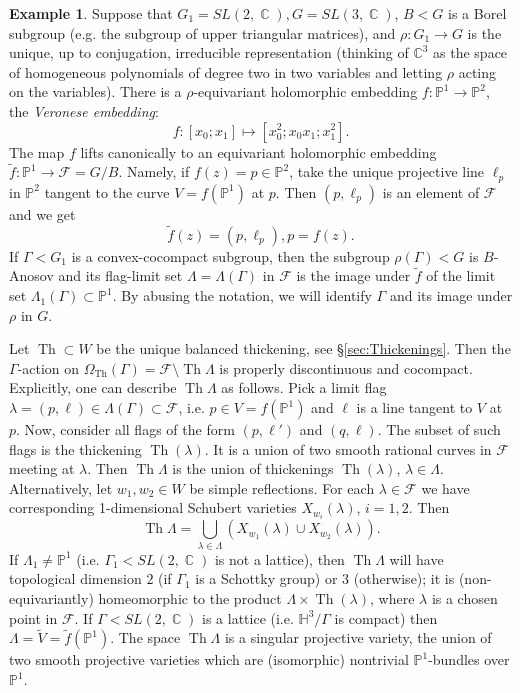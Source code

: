 \documentclass[12pt]{amsbook}%
\theoremstyle{definition}
\newtheorem{example}[thm]{Example}
\theoremstyle{remark}
\numberwithin{section}{chapter}
\numberwithin{subsection}{section}
\numberwithin{figure}{chapter}
\DeclareMathOperator{\C}{\mathbb{C}}
\DeclareMathOperator{\Th}{Th}
\def\bC{{\mathbb{C}}}
\def\P{{\mathbb{P}}}
\def\bH{{\mathbb{H}}}
\def\cF{{\mathscr{F}}}
\def\Ga{\Gamma}
\def\La{\Lambda}
\def\la{\lambda}
\def\kap{}
\begin{document}
{{\begin{example}\label{ex:Anosov1} 
Suppose that $G_1=SL(2,\C), G=SL(3,\C)$, $B<G$ is a Borel subgroup (e.g. the subgroup of upper triangular matrices), 
and $\rho: G_1\to G$ is the unique, up to conjugation, irreducible representation (thinking of $\bC^3$ as the space of homogeneous polynomials of degree two in two variables and letting $\rho$ acting on the variables). There is a $\rho$-equivariant holomorphic embedding $f: \P^1\to \P^2$, the {\em Veronese embedding}:
\[f:[x_0;x_1]\mapsto [x_0^2;x_0x_1;x_1^2].\]
The map $f$ lifts canonically to an equivariant holomorphic embedding 
$\tilde f: \P^1\to \cF= G/B$. Namely, if $f(z)= p\in \P^2$, take the unique projective line $\ell_p$ in $\P^2$ tangent to the curve $V=f(\P^1)$ at $p$. 
Then $(p, \ell_p)$ is an element of $\cF$ and we get 
$$
\tilde f(z)= (p, \ell_p), p=f(z). 
$$
If $\Ga< G_1$ is a convex-cocompact subgroup, then the subgroup $\rho(\Ga)< G$ is $B$-Anosov and its flag-limit set 
$\La=\La(\Ga)$ in $\cF$ is the image under $\tilde f$ of the limit set $\La_1(\Ga)\subset \P^1$. By abusing the notation, we will identify $\Ga$ and its image under $\rho$ in $G$. 


Let $\Th\subset W$ be the unique balanced thickening, see \S \ref{sec:Thickenings}. Then the $\Ga$-action on $\Omega_{\Th}(\Ga)=\cF\setminus \Th \La$ is properly discontinuous and cocompact. Explicitly, one can describe $ \Th \La$ 
as follows. Pick a limit flag $\la=(p,\ell)\in \La(\Ga)\subset \cF$, i.e. $p\in V=f(\P^1)$ and $\ell$ is a line tangent to $V$ at $p$. Now, consider all flags of the form $(p, \ell')$ and $(q, \ell)$. The subset of such flags is the thickening $\Th(\la)$. 
It is a union of two smooth rational curves in $\cF$ meeting at $\la$. 
Then $\Th \La$ is the union of thickenings $\Th(\la)$, $\la\in \La$. Alternatively, let $w_1, w_2\in W$ be simple reflections. For each $\la\in \cF$ we have corresponding 1-dimensional Schubert varieties $X_{w_i}(\la)$, $i=1,2$. Then 
$$
\Th\La= \bigcup_{\la\in \La} (X_{w_1}(\la) \cup X_{w_2}(\la)). 
$$
If $\La_1\ne \P^1$ (i.e. $\Ga_1< SL(2,\C)$ is not a lattice), then  $\Th \La$ will have topological dimension $2$ 
(if $\Ga_1$ is a Schottky group) or $3$ (otherwise); it is (non-equivariantly) homeomorphic to the product $\La\times \Th(\la)$, where $\la$ is a chosen point in $\cF$. If $\Ga< SL(2,\C)$ is a lattice (i.e. $\bH^3/\Ga$ is compact) then $\La=\tilde V=\tilde f(\P^1)$. The space $\Th \La$ is a singular 
projective variety, the union of two smooth projective varieties which are (isomorphic) nontrivial 
$\P^1$-bundles over $\P^1$. 


\end{example}}}
\end{document}
